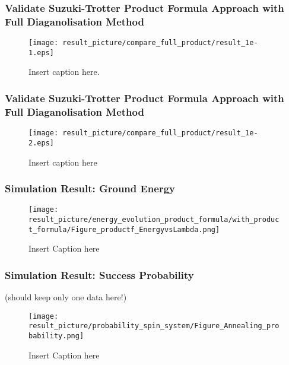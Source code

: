 \documentclass{beamer}
\begin{document}

\begin{frame}
	\frametitle{Validate Suzuki-Trotter Product Formula Approach with Full Diaganolisation Method}
	\begin{figure}[h]
		\centering
		\texttt{[image: result\_picture/compare\_full\_product/result\_1e-1.eps]}
		\caption{Insert caption here.}
		
	\end{figure}
\end{frame}


\begin{frame}
	\frametitle{Validate Suzuki-Trotter Product Formula Approach with Full Diaganolisation Method}
	\begin{figure}[h]
		\centering
		\texttt{[image: result\_picture/compare\_full\_product/result\_1e-2.eps]}
		\caption{Insert caption here}
		
	\end{figure}
\end{frame}


\begin{frame}
	\frametitle{Simulation Result: Ground Energy}
	\begin{figure}
		\centering
		\texttt{[image: result\_picture/energy\_evolution\_product\_formula/with\_product\_formula/Figure\_productf\_EnergyvsLambda.png]}
		\caption{Insert Caption here}
	\end{figure}
\end{frame}

\begin{frame}
	\frametitle{Simulation Result: Success Probability}
	(should keep only one data here!)
	\begin{figure}
		\centering
		\texttt{[image: result\_picture/probability\_spin\_system/Figure\_Annealing\_probability.png]}

		\caption{Insert Caption here}
	\end{figure}
\end{frame}
\end{document}
